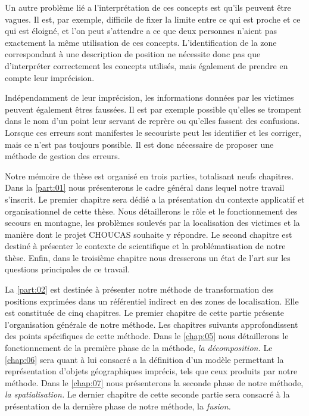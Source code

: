 Un autre problème lié a l'interprétation de ces concepts est qu'ils
peuvent être vagues.  Il est, par exemple, difficile de fixer la
limite entre ce qui est proche et ce qui est éloigné, et l'on peut
s'attendre a ce que deux personnes n'aient pas exactement la même
utilisation de ces concepts. L’identification de la zone correspondant
à une description de position ne nécessite donc pas que d'interpréter
correctement les concepts utilisés, mais également de prendre en
compte leur imprécision.

Indépendamment de leur imprécision, les informations données par les
victimes peuvent également êtres faussées. Il est par exemple possible
qu'elles se trompent dans le nom d'un point leur servant de reprère ou
qu'elles fassent des confusions. Lorsque ces erreurs sont manifestes
le secouriste peut les identifier et les corriger, mais ce n'est pas
toujours possible. Il est donc nécessaire de proposer une méthode de
gestion des erreurs.



Notre mémoire de thèse est organisé en trois parties, totalisant neufs
chapitres. Dans la \autoref{part:01} nous présenterons le cadre
général dans lequel notre travail s'inscrit. Le premier chapitre sera
dédié a la présentation du contexte applicatif et organisationnel de
cette thèse. Nous détaillerons le rôle et le fonctionnement des
secours en montagne, les problèmes soulevés par la localisation des
victimes et la manière dont le projet CHOUCAS souhaite y répondre. Le
second chapitre est destiné à présenter le contexte de scientifique et
la problématisation de notre thèse. Enfin, dans le troisième chapitre
nous dresserons un état de l'art sur les questions principales de ce
travail.

La \autoref{part:02} est destinée à présenter notre méthode de
transformation des positions exprimées dans un référentiel indirect en
des zones de localisation. Elle est constituée de cinq chapitres. Le
premier chapitre de cette partie présente l’organisation générale de
notre méthode. Les chapitres suivants approfondissent des points
spécifiques de cette méthode. Dans le \autoref{chap:05} nous
détaillerons le fonctionnement de la première phase de la méthode,
\emph{la décomposition.} Le \autoref{chap:06} sera quant à lui
consacré a la définition d'un modèle permettant la représentation
d'objets géographiques imprécis, tels que ceux produits par notre
méthode. Dans le \autoref{chap:07} nous présenterons la seconde phase
de notre méthode, \emph{la spatialisation.} Le dernier chapitre de
cette seconde partie sera consacré à la présentation de la dernière
phase de notre méthode, la \emph{fusion.}

